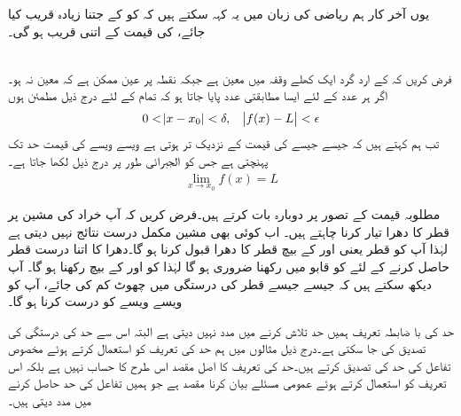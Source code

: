 یوں آخر کار ہم ریاضی کی زبان میں یہ کہہ سکتے ہیں کہ  کو  کے جتنا زیادہ قریب کیا جائے،  کی قیمت  کے اتنی قریب ہو گی۔

\\
فرض کریں کہ   کے ارد گرد ایک کھلے وقفہ میں  معین ہے جبکہ نقطہ  پر عین ممکن ہے کہ  معین نہ ہو۔ اگر ہر عدد  کے لئے ایسا مطابقتی عدد  پایا جاتا ہو کہ تمام  کے لئے درج ذیل مطمئن ہوں  
\begin{align*}
0<\abs{x-x_0}<\delta,\quad \abs{f(x)-L}<\epsilon
\end{align*}
تب ہم کہتے ہیں کہ جیسے جیسے  کی قیمت  کے نزدیک تر ہوتی ہے  ویسے ویسے  کی قیمت حد  تک پہنچتی ہے جس کو الجبرائی طور پر درج ذیل لکھا جاتا ہے۔
\begin{align*}
\lim_{x\to x_0} f(x)=L
\end{align*} 

مطلوبہ قیمت کے تصور پر دوبارہ بات کرتے ہیں۔فرض کریں کہ آپ خراد کی مشین پر قطر  کا دھرا تیار کرنا چاہتے ہیں۔ اب کوئی بھی مشین مکمل درست نتائج نہیں دیتی ہے لہٰذا  آپ کو  قطر یعنی  اور  کے بیچ قطر کا دھرا قبول کرنا ہو گا۔دھرا کا اتنا درست قطر حاصل کرنے کے لئے  کو قابو میں رکھنا ضروری ہو گا لہٰذا  کو  اور  کے بیچ رکھنا ہو گا۔ آپ دیکھ سکتے ہیں کہ جیسے جیسے قطر کی درستگی میں چھوٹ  کم کی جائے، آپ کو ویسے ویسے  کو درست کرنا ہو گا۔

حد کی با ضابطہ تعریف ہمیں حد تلاش کرنے میں مدد نہیں دیتی ہے البتہ اس سے حد کی درستگی کی تصدیق کی جا سکتی ہے۔درج ذیل مثالوں میں ہم حد کی تعریف کو استعمال کرتے ہوئے مخصوص تفاعل کی حد کی تصدیق کرتے ہیں۔حد کی تعریف کا اصل مقصد اس طرح کا حساب نہیں ہے بلکہ اس تعریف کو استعمال کرتے ہوئے عمومی مسئلے بیان کرنا مقصد ہے جو ہمیں تفاعل کی حد حاصل کرنے میں مدد دیتی ہیں۔
 

